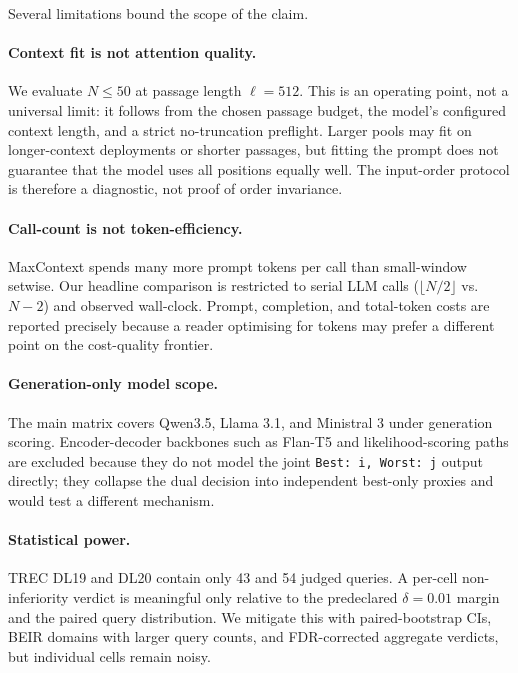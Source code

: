 Several limitations bound the scope of the claim.

\paragraph{Context fit is not attention quality.}
We evaluate $N \le 50$ at passage length $\ell=512$. This is an operating
point, not a universal limit: it follows from the chosen passage budget,
the model's configured context length, and a strict no-truncation
preflight. Larger pools may fit on longer-context deployments or shorter
passages, but fitting the prompt does not guarantee that the model uses
all positions equally well. The input-order protocol is therefore a
diagnostic, not proof of order invariance.

\paragraph{Call-count is not token-efficiency.}
MaxContext spends many more prompt tokens per call than small-window
setwise. Our headline comparison is restricted to serial LLM calls
($\lfloor N/2 \rfloor$ vs.\ $N{-}2$) and observed wall-clock. Prompt,
completion, and total-token costs are reported precisely because a reader
optimising for tokens may prefer a different point on the cost-quality
frontier.

\paragraph{Generation-only model scope.}
The main matrix covers Qwen3.5, Llama 3.1, and Ministral 3 under
generation scoring. Encoder-decoder backbones such as Flan-T5 and
likelihood-scoring paths are excluded because they do not model the joint
\texttt{Best: i, Worst: j} output directly; they collapse the dual
decision into independent best-only proxies and would test a different
mechanism.

\paragraph{Statistical power.}
TREC DL19 and DL20 contain only 43 and 54 judged queries. A per-cell
non-inferiority verdict is meaningful only relative to the predeclared
$\delta=0.01$ margin and the paired query distribution. We mitigate this
with paired-bootstrap CIs, BEIR domains with larger query counts, and
FDR-corrected aggregate verdicts, but individual cells remain noisy.

